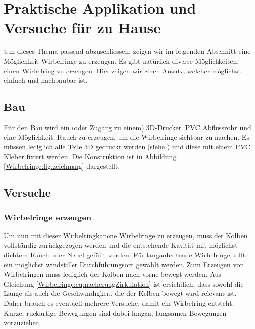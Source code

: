 %
%
%
\section{Praktische Applikation und Versuche für zu Hause}

Um dieses Thema passend abzuschliessen, zeigen wir im folgenden Abschnitt eine Möglichkeit Wirbelringe zu erzeugen.
Es gibt natürlich diverse Möglichkeiten, einen Wirbelring zu erzeugen. 
Hier zeigen wir einen Ansatz, welcher möglichst einfach und nachbaubar ist.

\subsection{Bau}


Für den Bau wird ein (oder Zugang zu einem) 3D-Drucker,  PVC Abflussrohr und eine Möglichkeit, Rauch zu erzeugen, um die Wirbelringe sichtbar zu machen. 
Es müssen lediglich alle Teile 3D gedruckt werden (siehe \cite{Wirbelringe:3D_modelle}) und diese mit einem PVC Kleber fixiert werden. 
Die Konstruktion ist in Abbildung \ref{Wirbelringe:fig:zeichnung} dargestellt.

\subsection{Versuche}

\subsubsection{Wirbelringe erzeugen\label{Wirbelringe:wirbelringeerzeugen}}

Um nun mit dieser Wirbelringkanone Wirbelringe zu erzeugen, muss der Kolben vollständig zurückgezogen werden und die entstehende Kavität mit möglichst dichtem Rauch oder Nebel gefüllt werden.
Für langanhaltende Wirbelringe sollte ein möglichst windstiller Durchführungsort gewählt werden.
Zum Erzeugen von Wirbelringen muss lediglich der Kolben nach vorne bewegt werden.
Aus Gleichung \eqref{Wirbelringe:eq:naeherungZirkulation} ist ersichtlich, dass sowohl die Länge als auch die Geschwindigkeit, die der Kolben bewegt wird relevant ist.
Daher brauch es eventuell mehrere Versuche, damit ein Wirbelring entsteht.
Kurze, ruckartige Bewegungen sind dabei langen, langsamen Bewegungen vorzuziehen.


